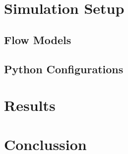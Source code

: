 \documentclass[we,final,11pt,oneside,openany]{uantwerpenbamathesis}
\begin{document}
\chapter{Simulation Setup}
\label{ch:simulation-setup}

\section{Flow Models}
\label{sec:flow-models}

\section{Python Configurations}
\label{sec:python-configurations}

\chapter{Results}
\label{ch:results}

\chapter{Conclussion}
\label{ch:conclussion}

\appendix



\end{document}

